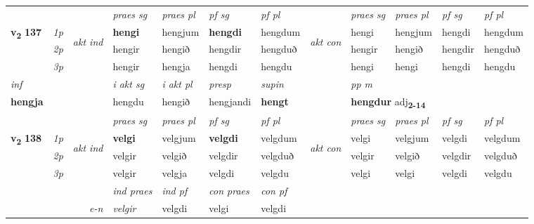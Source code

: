 \begin{longtable}[l]{X>{\footnotesize\itshape}llXXXXlXXXX}
 & &   & \textit{praes sg}  & \textit{praes pl}    & \textit{ pf sg} & \textit{pf pl} & & \textit{praes sg}  & \textit{praes pl}    & \textit{pf sg} & \textit{pf pl }  \\ \cmidrule{4-7} \cmidrule{9-12}
 \multirow{2}{*}{{{\textbf{v{\textsubscript{2}}} \Large{\textbf{137}}}}}  & 1p & \multirow{3}{*}{\begin{turn}{90}\textit{akt ind}\end{turn}} & \textbf{hengi} & hengjum & \textbf{hengdi} & hengdum & \multirow{3}{*}{\begin{turn}{90}\textit{akt con}\end{turn}} &hengi & hengjum & hengdi & hengdum\\*
 & 2p &  &  hengir  & hengið & hengdir & hengduð & & hengir & hengið & hengdir & hengduð \\*
 & 3p &  & hengir & hengja & hengdi & hengdu & & hengi & hengi& hengdi & hengdu \\*
\cmidrule{4-7} \cmidrule{9-12}

   {\textit{inf}} & &  & \textit{i akt sg} & \textit{i akt pl}   & \textit{presp} & \textit{supin}  && \textit{pp m} \\*
  {\textbf{hengja}} & && hengdu  & hengið   & hengjandi &  \textbf{hengt}  && \multicolumn{2}{l}{\textbf{hengdur} adj\textbf{\textsubscript{2-14}}} \\*

\midrule

 & &   & \textit{praes sg}  & \textit{praes pl}    & \textit{ pf sg} & \textit{pf pl} & & \textit{praes sg}  & \textit{praes pl}    & \textit{pf sg} & \textit{pf pl }  \\ \cmidrule{4-7} \cmidrule{9-12}
 \multirow{2}{*}{{{\textbf{v{\textsubscript{2}}} \Large{\textbf{138}}}}}  & 1p & \multirow{3}{*}{\begin{turn}{90}\textit{akt ind}\end{turn}} & \textbf{velgi} & velgjum & \textbf{velgdi} & velgdum & \multirow{3}{*}{\begin{turn}{90}\textit{akt con}\end{turn}} &velgi & velgjum & velgdi & velgdum\\*
 & 2p &  &  velgir  & velgið & velgdir & velgduð & & velgir & velgið & velgdir & velgduð \\*
 & 3p &  & velgir & velgja & velgdi & velgdu & & velgi & velgi& velgdi & velgdu \\*
\cmidrule{4-7} \cmidrule{9-12}

   && &  \textit{ind praes} & \textit{ind pf} & \textit{con praes} & \textit{con pf} \\*
\multicolumn{3}{r}{\textit{e-n}} & velgir & velgdi & velgi & velgdi \\*


\end{longtable}
